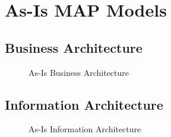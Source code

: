 \appendix
\section{As-Is MAP Models}
\label{sec:as_is_map_model}
\subsection{Business Architecture}
\begin{center}
	\begin{figure}[H]
		\centering
		\setlength\fboxsep{7pt}
		\setlength\fboxrule{0.5pt}
		\caption{As-Is Business Architecture}
		\label{fig:map_business_as_is}
	\end{figure}
\end{center}
%
\vspace{-5cm}
\subsection{Information Architecture}
\begin{center}
	\begin{figure}[H]
		\centering
		\setlength\fboxsep{7pt}
		\setlength\fboxrule{0.5pt}
		\caption{As-Is Information Architecture}
		\label{fig:map_application_as_is}
	\end{figure}
\end{center}
%
